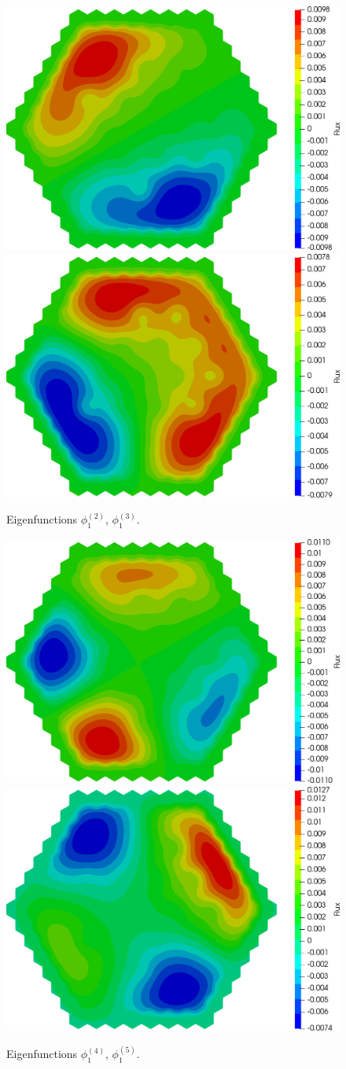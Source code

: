 \documentclass[authoryear]{elsarticle}
\begin{document}
\begin{figure}[h]
\begin{center}
	\includegraphics[width=0.49\linewidth]{iaea_cosym/sp3_alpha_u1_2_assym.png}
	\includegraphics[width=0.49\linewidth]{iaea_cosym/sp3_alpha_u1_3_assym.png}\\
	\caption{Eigenfunctions $\phi_1^{(2)}$, $\phi_1^{(3)}$.}
	\label{fig:iaea_cosym_fun_2}
\end{center}
\end{figure}

\begin{figure}[h]
\begin{center}
	\includegraphics[width=0.49\linewidth]{iaea_cosym/sp3_alpha_u1_4_assym.png}
	\includegraphics[width=0.49\linewidth]{iaea_cosym/sp3_alpha_u1_5_assym.png}\\
	\caption{Eigenfunctions $\phi_1^{(4)}$, $\phi_1^{(5)}$.}
	\label{fig:iaea_cosym_fun_3}
\end{center}
\end{figure}
\end{document}
